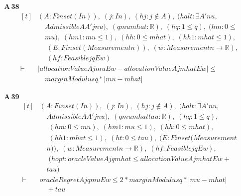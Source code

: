 \noindent\textbf{A\,38}\quad{}
{\footnotesize\[ \begin{aligned}[t]
&(\mathit{A} : \mathit{Finset} (\mathit{I} \mathit{n})),\; (\mathit{j} : \mathit{I} \mathit{n}),\; (\mathit{hj} : \mathit{j} \notin \mathit{A}),\; (\mathit{halt} : \exists \mathit{A'} \mathit{nu},\\
&\quad \mathit{Admissible} \mathit{A} \mathit{A'} \mathit{j} \mathit{nu}),\; (\mathit{q} \mathit{mu} \mathit{mhat} : \mathbb{R} ),\; (\mathit{hq} : 1 \leq \mathit{q}),\; (\mathit{hm} : 0 \leq\\
&\quad \mathit{mu}),\; (\mathit{hm1} : \mathit{mu} \leq 1),\; (\mathit{hh} : 0 \leq \mathit{mhat}),\; (\mathit{hh1} : \mathit{mhat} \leq 1),\\
&\quad \; (\mathit{E} : \mathit{Finset} (\mathit{Measurement} \mathit{n})),\; (\mathit{w} : \mathit{Measurement} \mathit{n} \to \mathbb{R} ),\\
&\quad \; (\mathit{hf} : \mathit{Feasible} \mathit{j} \mathit{q} \mathit{E} \mathit{w})\\
\vdash\;&|\mathit{allocationValue} \mathit{A} \mathit{j} \mathit{mu} \mathit{E} \mathit{w}-\mathit{allocationValue} \mathit{A} \mathit{j} \mathit{mhat} \mathit{E} \mathit{w}| \leq\\
&\quad \mathit{marginModulus} \mathit{q}*|\mathit{mu}-\mathit{mhat}|
\end{aligned} \]}

\noindent\textbf{A\,39}\quad{}
{\footnotesize\[ \begin{aligned}[t]
&(\mathit{A} : \mathit{Finset} (\mathit{I} \mathit{n})),\; (\mathit{j} : \mathit{I} \mathit{n}),\; (\mathit{hj} : \mathit{j} \notin \mathit{A}),\; (\mathit{halt} : \exists \mathit{A'} \mathit{nu},\\
&\quad \mathit{Admissible} \mathit{A} \mathit{A'} \mathit{j} \mathit{nu}),\; (\mathit{q} \mathit{mu} \mathit{mhat} \mathit{tau} : \mathbb{R} ),\; (\mathit{hq} : 1 \leq \mathit{q}),\\
&\quad \; (\mathit{hm} : 0 \leq \mathit{mu}),\; (\mathit{hm1} : \mathit{mu} \leq 1),\; (\mathit{hh} : 0 \leq \mathit{mhat}),\\
&\quad \; (\mathit{hh1} : \mathit{mhat} \leq 1),\; (\mathit{ht} : 0 \leq \mathit{tau}),\; (\mathit{E} : \mathit{Finset} (\mathit{Measurement}\\
&\quad \mathit{n})),\; (\mathit{w} : \mathit{Measurement} \mathit{n} \to \mathbb{R} ),\; (\mathit{hf} : \mathit{Feasible} \mathit{j} \mathit{q} \mathit{E} \mathit{w}),\\
&\quad \; (\mathit{hopt} : \mathit{oracleValue} \mathit{A} \mathit{j} \mathit{q} \mathit{mhat} \leq \mathit{allocationValue} \mathit{A} \mathit{j} \mathit{mhat} \mathit{E} \mathit{w}+\\
&\quad \mathit{tau})\\
\vdash\;&\mathit{oracleRegret} \mathit{A} \mathit{j} \mathit{q} \mathit{mu} \mathit{E} \mathit{w} \leq 2*\mathit{marginModulus} \mathit{q}*|\mathit{mu}-\mathit{mhat}|\\
&\quad +\mathit{tau}
\end{aligned} \]}

